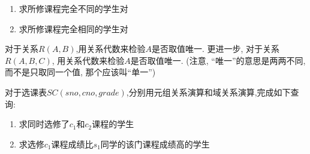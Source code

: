 \begin{problemset}
\begin{enumerate}
  \item 求所修课程完全不同的学生对
  
  \item 求所修课程完全相同的学生对
\end{enumerate}
    \item 对于关系$R (A, B)$,用关系代数来检验$A$是否取值唯一. 更进一步, 对于关系$R(A, B, C)$, 用关系代数来检验$A$是否取值唯一. (注意, ``唯一''的意思是两两不同, 而不是只取同一个值, 那个应该叫``单一'')
    \item 对于选课表$SC(sno, cno, grade)$,分别用元组关系演算和域关系演算,完成如下查询:
\begin{enumerate}
  \item 求同时选修了$c_1$和$c_2$课程的学生
  
  \item 求选修$c_1$课程成绩比$s_1$同学的该门课程成绩高的学生
\end{enumerate}
\end{problemset}
